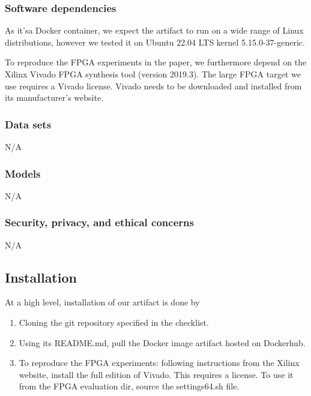 \documentclass[letterpaper,twocolumn,10pt]{article}
\begin{document}
{\subsubsection{Software dependencies}

As it'sa Docker container, we expect the artifact to run on a wide range
of Linux distributions, however we tested it on Ubuntu 22.04 LTS kernel
5.15.0-37-generic.

To reproduce the FPGA experiments in the paper, we furthermore depend
on the Xilinx Vivado FPGA synthesis tool (version 2019.3).  The large
FPGA target we use requires a Vivado license. Vivado needs to be downloaded
and installed from its manufacturer's website.

\subsubsection{Data sets}

N/A

\subsubsection{Models}

N/A

\subsubsection{Security, privacy, and ethical concerns}

N/A

\subsection{Installation}

At a high level, installation of our artifact is done by
\begin{enumerate}
    \item Cloning the git repository specified in the checklist.
    \item Using its README.md, pull the Docker image artifact
        hosted on Dockerhub.
    \item To reproduce the FPGA experiments: following instructions
        from the Xilinx website, install the full edition of Vivado.
        This requires a license. To use it from the \ourname
        FPGA evaluation dir, source the settings64.sh
        file.
\end{enumerate}

}
\end{document}
